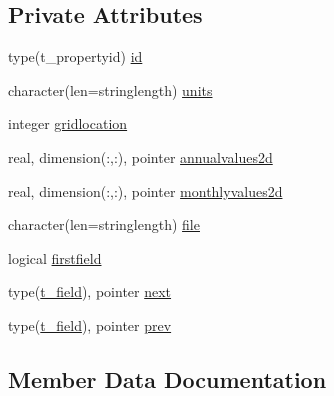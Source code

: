 \subsection*{Private Attributes}
\begin{DoxyCompactItemize}
\item 
type(t\+\_\+propertyid) \mbox{\hyperlink{structmodulehellermanrosensteinascii_1_1t__field_a82d021bfae0ce8a0717da0a26bd7a159}{id}}
\item 
character(len=stringlength) \mbox{\hyperlink{structmodulehellermanrosensteinascii_1_1t__field_a49532f5297768e45ae7d31be02b8534e}{units}}
\item 
integer \mbox{\hyperlink{structmodulehellermanrosensteinascii_1_1t__field_a1af1e0cb1b4aaa0e4be6f9d7a3cadc2a}{gridlocation}}
\item 
real, dimension(\+:,\+:), pointer \mbox{\hyperlink{structmodulehellermanrosensteinascii_1_1t__field_aa2230e44471045d8a98fc06361d40f8b}{annualvalues2d}}
\item 
real, dimension(\+:,\+:), pointer \mbox{\hyperlink{structmodulehellermanrosensteinascii_1_1t__field_a6f7c6ceb712a3f42b544c595a117a28b}{monthlyvalues2d}}
\item 
character(len=stringlength) \mbox{\hyperlink{structmodulehellermanrosensteinascii_1_1t__field_ac973c4003bc13c296c826833d22d04cf}{file}}
\item 
logical \mbox{\hyperlink{structmodulehellermanrosensteinascii_1_1t__field_a4f5aa35e5f6da63184d0f917444ef1db}{firstfield}}
\item 
type(\mbox{\hyperlink{structmodulehellermanrosensteinascii_1_1t__field}{t\+\_\+field}}), pointer \mbox{\hyperlink{structmodulehellermanrosensteinascii_1_1t__field_a50c2324e7276ffb2b745b01a2288ddbd}{next}}
\item 
type(\mbox{\hyperlink{structmodulehellermanrosensteinascii_1_1t__field}{t\+\_\+field}}), pointer \mbox{\hyperlink{structmodulehellermanrosensteinascii_1_1t__field_aa6ecc2ee4fa73054e3c7b29498901c25}{prev}}
\end{DoxyCompactItemize}


\subsection{Member Data Documentation}
\mbox{\label{structmodulehellermanrosensteinascii_1_1t__field_aa2230e44471045d8a98fc06361d40f8b}} 
